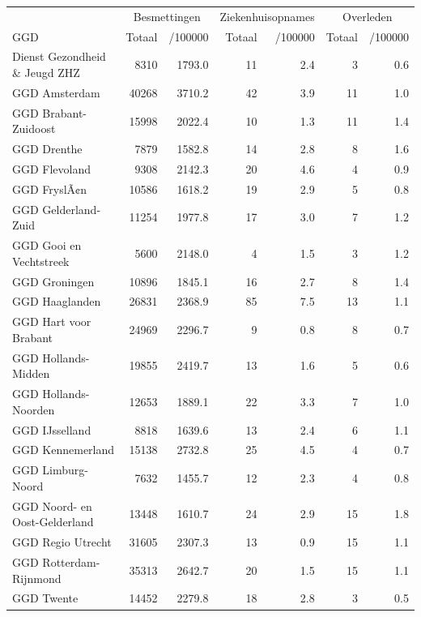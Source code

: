 \documentclass[
  english,
  man,floatsintext]{apa6}
\begin{document}
\begin{table}
\centering\begingroup\fontsize{10}{12}\selectfont

\begin{threeparttable}
\begin{tabular}{lrrrrrr}
\toprule
\multicolumn{1}{c}{ } & \multicolumn{2}{c}{Besmettingen} & \multicolumn{2}{c}{Ziekenhuisopnames} & \multicolumn{2}{c}{Overleden} \\
\cmidrule(l{3pt}r{3pt}){2-3} \cmidrule(l{3pt}r{3pt}){4-5} \cmidrule(l{3pt}r{3pt}){6-7}
GGD & Totaal & /100000 & Totaal & /100000 & Totaal & /100000\\
\midrule
Dienst Gezondheid \& Jeugd ZHZ & 8310 & 1793.0 & 11 & 2.4 & 3 & 0.6\\
GGD Amsterdam & 40268 & 3710.2 & 42 & 3.9 & 11 & 1.0\\
GGD Brabant-Zuidoost & 15998 & 2022.4 & 10 & 1.3 & 11 & 1.4\\
GGD Drenthe & 7879 & 1582.8 & 14 & 2.8 & 8 & 1.6\\
GGD Flevoland & 9308 & 2142.3 & 20 & 4.6 & 4 & 0.9\\
GGD FryslÃ¢n & 10586 & 1618.2 & 19 & 2.9 & 5 & 0.8\\
GGD Gelderland-Zuid & 11254 & 1977.8 & 17 & 3.0 & 7 & 1.2\\
GGD Gooi en Vechtstreek & 5600 & 2148.0 & 4 & 1.5 & 3 & 1.2\\
GGD Groningen & 10896 & 1845.1 & 16 & 2.7 & 8 & 1.4\\
GGD Haaglanden & 26831 & 2368.9 & 85 & 7.5 & 13 & 1.1\\
GGD Hart voor Brabant & 24969 & 2296.7 & 9 & 0.8 & 8 & 0.7\\
GGD Hollands-Midden & 19855 & 2419.7 & 13 & 1.6 & 5 & 0.6\\
GGD Hollands-Noorden & 12653 & 1889.1 & 22 & 3.3 & 7 & 1.0\\
GGD IJsselland & 8818 & 1639.6 & 13 & 2.4 & 6 & 1.1\\
GGD Kennemerland & 15138 & 2732.8 & 25 & 4.5 & 4 & 0.7\\
GGD Limburg-Noord & 7632 & 1455.7 & 12 & 2.3 & 4 & 0.8\\
GGD Noord- en Oost-Gelderland & 13448 & 1610.7 & 24 & 2.9 & 15 & 1.8\\
GGD Regio Utrecht & 31605 & 2307.3 & 13 & 0.9 & 15 & 1.1\\
GGD Rotterdam-Rijnmond & 35313 & 2642.7 & 20 & 1.5 & 15 & 1.1\\
GGD Twente & 14452 & 2279.8 & 18 & 2.8 & 3 & 0.5\\

\end{tabular}
\end{threeparttable}
\end{table}
\end{document}
